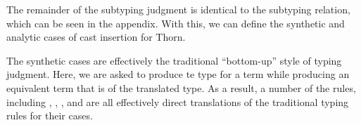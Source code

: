 \documentclass[a4paper,USenglish]{tex/lipics-v2016}
\begin{document}
The remainder of the subtyping judgment is identical to the \kafka subtyping relation, which can be seen in the appendix. With this, we can define the synthetic and analytic cases of cast insertion for Thorn.

\newcommand{\ba}{\xt{!}}

\begin{mathpar}





\end{mathpar}

The synthetic cases are effectively the traditional ``bottom-up'' style of typing judgment. Here, we are asked to produce te type for a term while producing an equivalent \kafka term that is of the translated type. As a result, a number of the rules, including , , , and  are all effectively direct translations of the traditional typing rules for their cases.
\end{document}
